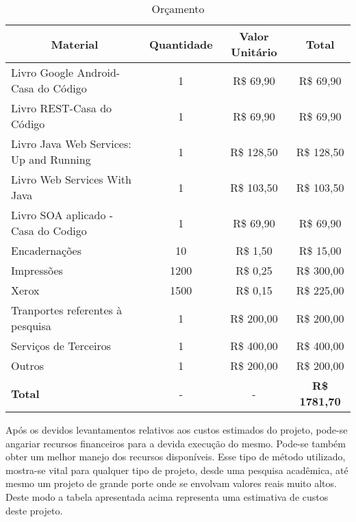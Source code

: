 \begin{table} [h]
  \caption[Orçamento]
          {Orçamento}
  \centering
  \begin{small}
  \setlength{\tabcolsep}{1pt}
  \begin{tabular}{|p{3.5in}|c|c|c|}
    \hline 
    \multicolumn{1}{|c|}{\textbf{Material}} & 
    \multicolumn{1}{c|}{\textbf{Quantidade}} &
    \multicolumn{1}{c|}{\textbf{Valor Unitário}} &
    \multicolumn{1}{c|}{\textbf{Total}}\\\hline\hline 
    
    Livro Google Android-Casa do Código &1 &R\$ 69,90 &R\$ 69,90 \\\hline
    
    Livro REST-Casa do Código &1 &R\$ 69,90 &R\$ 69,90 \\\hline
    
    Livro Java Web Services: Up and Running   &1   &R\$ 128,50 &R\$ 128,50 \\\hline
    
    Livro Web Services With Java   &1   &R\$ 103,50 &R\$ 103,50 \\\hline
    
    Livro SOA aplicado - Casa do Codigo  &1   &R\$ 69,90 &R\$ 69,90 \\\hline 
    
    Encadernações &10   &R\$ 1,50 &R\$ 15,00 \\\hline
    
    Impressões            &1200  &R\$ 0,25 &R\$ 300,00 \\\hline
    
    Xerox &1500  &R\$ 0,15 &R\$ 225,00 \\\hline
    
    Tranportes referentes à pesquisa &1  &R\$ 200,00 &R\$ 200,00 \\\hline
    
    Serviços de Terceiros &1  &R\$ 400,00 &R\$ 400,00 \\\hline
    
    Outros &1  &R\$ 200,00 &R\$ 200,00 \\\hline
    
    \textbf{Total}        &-   &-         &\textbf{R\$ 1781,70} \\\hline
    
  \end{tabular}
  \end{small}
  
\end{table}

	\par Após os devidos levantamentos relativos aos custos estimados do projeto,
pode-se angariar recursos financeiros para a devida execução do mesmo. Pode-se
também obter um melhor manejo dos recursos disponíveis. Esse tipo de método
utilizado, mostra-se vital para qualquer tipo de projeto, desde uma pesquisa
acadêmica, até mesmo um projeto de grande porte onde se envolvam valores reais
muito altos. Deste modo a tabela apresentada acima representa uma estimativa de custos
deste projeto.